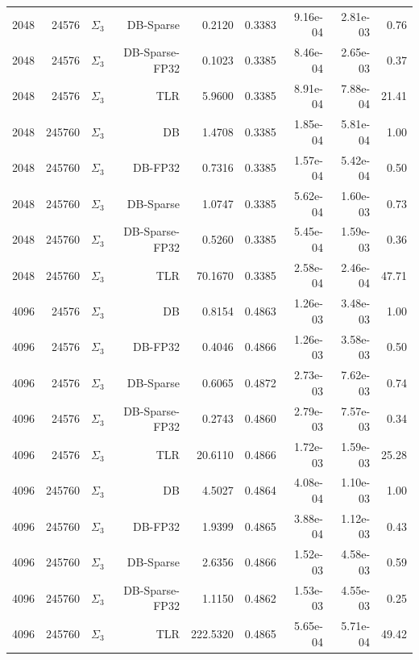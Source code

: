 \begin{tabular}{|r|r|r|r|r|r|r|r|r|}
  2048 & 24576 & $\Sigma_3$ & DB-Sparse & 0.2120 & 0.3383 & 9.16e-04 & 2.81e-03 & 0.76 \\
  2048 & 24576 & $\Sigma_3$ & DB-Sparse-FP32 & 0.1023 & 0.3385 & 8.46e-04 & 2.65e-03 & 0.37 \\
  2048 & 24576 & $\Sigma_3$ & TLR & 5.9600 & 0.3385 & 8.91e-04 & 7.88e-04 & 21.41 \\
  2048 & 245760 & $\Sigma_3$ & DB & 1.4708 & 0.3385 & 1.85e-04 & 5.81e-04 & 1.00 \\
  2048 & 245760 & $\Sigma_3$ & DB-FP32 & 0.7316 & 0.3385 & 1.57e-04 & 5.42e-04 & 0.50 \\
  2048 & 245760 & $\Sigma_3$ & DB-Sparse & 1.0747 & 0.3385 & 5.62e-04 & 1.60e-03 & 0.73 \\
  2048 & 245760 & $\Sigma_3$ & DB-Sparse-FP32 & 0.5260 & 0.3385 & 5.45e-04 & 1.59e-03 & 0.36 \\
  2048 & 245760 & $\Sigma_3$ & TLR & 70.1670 & 0.3385 & 2.58e-04 & 2.46e-04 & 47.71 \\
  4096 & 24576 & $\Sigma_3$ & DB & 0.8154 & 0.4863 & 1.26e-03 & 3.48e-03 & 1.00 \\
  4096 & 24576 & $\Sigma_3$ & DB-FP32 & 0.4046 & 0.4866 & 1.26e-03 & 3.58e-03 & 0.50 \\
  4096 & 24576 & $\Sigma_3$ & DB-Sparse & 0.6065 & 0.4872 & 2.73e-03 & 7.62e-03 & 0.74 \\
  4096 & 24576 & $\Sigma_3$ & DB-Sparse-FP32 & 0.2743 & 0.4860 & 2.79e-03 & 7.57e-03 & 0.34 \\
  4096 & 24576 & $\Sigma_3$ & TLR & 20.6110 & 0.4866 & 1.72e-03 & 1.59e-03 & 25.28 \\
  4096 & 245760 & $\Sigma_3$ & DB & 4.5027 & 0.4864 & 4.08e-04 & 1.10e-03 & 1.00 \\
  4096 & 245760 & $\Sigma_3$ & DB-FP32 & 1.9399 & 0.4865 & 3.88e-04 & 1.12e-03 & 0.43 \\
  4096 & 245760 & $\Sigma_3$ & DB-Sparse & 2.6356 & 0.4866 & 1.52e-03 & 4.58e-03 & 0.59 \\
  4096 & 245760 & $\Sigma_3$ & DB-Sparse-FP32 & 1.1150 & 0.4862 & 1.53e-03 & 4.55e-03 & 0.25 \\
  4096 & 245760 & $\Sigma_3$ & TLR & 222.5320 & 0.4865 & 5.65e-04 & 5.71e-04 & 49.42 \\
  \hline
\end{tabular}
